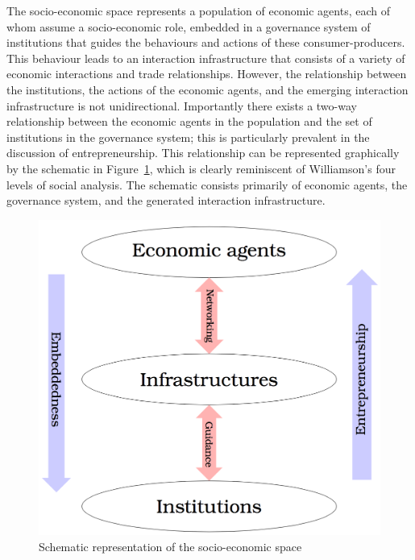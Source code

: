 The socio-economic space represents a population of economic agents, each of whom assume a socio-economic role, embedded in a governance system of institutions that guides the behaviours and actions of these consumer-producers. This behaviour leads to an interaction infrastructure that consists of a variety of economic interactions and trade relationships. However, the relationship between the institutions, the actions of the economic agents, and the emerging interaction infrastructure is not unidirectional. Importantly there exists a two-way relationship between the economic agents in the population and the set of institutions in the governance system; this is particularly prevalent in the discussion of entrepreneurship. This relationship can be represented graphically by the schematic in Figure~\ref{spacestructure}, which is clearly reminiscent of Williamson's four levels of social analysis. The schematic consists primarily of economic agents, the governance system, and the generated interaction infrastructure.

\begin{figure}[t]
\centering
\includegraphics[scale=0.25]{imgs/structure-space.png}
\caption{Schematic representation of the socio-economic space}
\label{spacestructure}
\end{figure}

